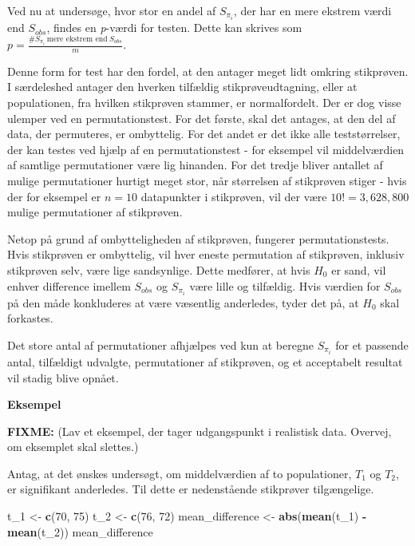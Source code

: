 \documentclass[
]{book}
\newenvironment{Shaded}{\begin{snugshade}}{\end{snugshade}}
\newcommand{\DecValTok}[1]{\textcolor[rgb]{0.00,0.00,0.81}{#1}}
\newcommand{\KeywordTok}[1]{\textcolor[rgb]{0.13,0.29,0.53}{\textbf{#1}}}
\newcommand{\NormalTok}[1]{#1}
\newcommand{\OperatorTok}[1]{\textcolor[rgb]{0.81,0.36,0.00}{\textbf{#1}}}
\newcommand{\StringTok}[1]{\textcolor[rgb]{0.31,0.60,0.02}{#1}}
\theoremstyle{definition}
\theoremstyle{definition}
\theoremstyle{definition}
\theoremstyle{remark}
\begin{document}
Ved nu at undersøge, hvor stor en andel af \(S_{\pi_i}\), der har en mere ekstrem værdi end \(S_{obs}\), findes en \emph{p}-værdi for testen. Dette kan skrives som \(p = \frac{\# S_{\pi_i}~ \text{mere ekstrem end}~ S_{obs}}{m}\).

Denne form for test har den fordel, at den antager meget lidt omkring stikprøven. I særdeleshed antager den hverken tilfældig stikprøveudtagning, eller at populationen, fra hvilken stikprøven stammer, er normalfordelt. Der er dog visse ulemper ved en permutationstest. For det første, skal det antages, at den del af data, der permuteres, er ombyttelig. For det andet er det ikke alle teststørrelser, der kan testes ved hjælp af en permutationstest - for eksempel vil middelværdien af samtlige permutationer være lig hinanden. For det tredje bliver antallet af mulige permutationer hurtigt meget stor, når størrelsen af stikprøven stiger - hvis der for eksempel er \(n = 10\) datapunkter i stikprøven, vil der være \(10! = 3,628,800\) mulige permutationer af stikprøven.

Netop på grund af ombytteligheden af stikprøven, fungerer permutationstests. Hvis stikprøven er ombyttelig, vil hver eneste permutation af stikprøven, inklusiv stikprøven selv, være lige sandsynlige. Dette medfører, at hvis \(H_0\) er sand, vil enhver difference imellem \(S_{obs}\) og \(S_{\pi_i}\) være lille og tilfældig. Hvis værdien for \(S_{obs}\) på den måde konkluderes at være væsentlig anderledes, tyder det på, at \(H_0\) skal forkastes.

Det store antal af permutationer afhjælpes ved kun at beregne \(S_{\pi_i}\) for et passende antal, tilfældigt udvalgte, permutationer af stikprøven, og et acceptabelt resultat vil stadig blive opnået.

\textbf{Eksempel}

\textbf{FIXME:} (Lav et eksempel, der tager udgangspunkt i realistisk data. Overvej, om eksemplet skal slettes.)

Antag, at det ønskes undersøgt, om middelværdien af to populationer, \(T_1\) og \(T_2\), er signifikant anderledes. Til dette er nedenstående stikprøver tilgængelige.

\begin{Shaded}
\begin{Highlighting}[]
\NormalTok{t_}\DecValTok{1}\NormalTok{ <-}\StringTok{ }\KeywordTok{c}\NormalTok{(}\DecValTok{70}\NormalTok{, }\DecValTok{75}\NormalTok{)}
\NormalTok{t_}\DecValTok{2}\NormalTok{ <-}\StringTok{ }\KeywordTok{c}\NormalTok{(}\DecValTok{76}\NormalTok{, }\DecValTok{72}\NormalTok{)}
\NormalTok{mean_difference <-}\StringTok{ }\KeywordTok{abs}\NormalTok{(}\KeywordTok{mean}\NormalTok{(t_}\DecValTok{1}\NormalTok{) }\OperatorTok{-}\StringTok{ }\KeywordTok{mean}\NormalTok{(t_}\DecValTok{2}\NormalTok{))}
\NormalTok{mean_difference}
\end{Highlighting}
\end{Shaded}
\end{document}
